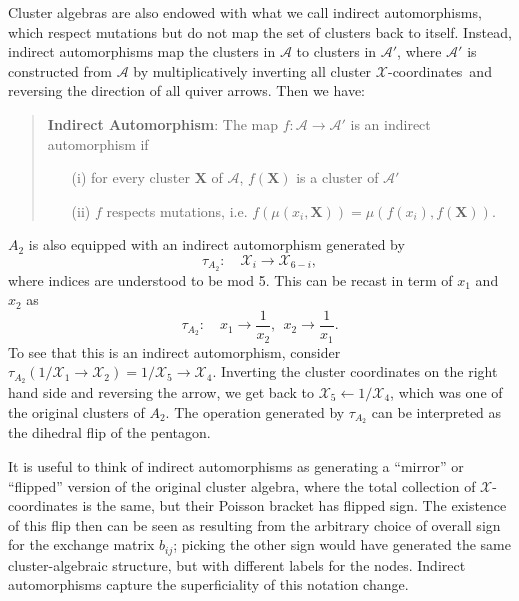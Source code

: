 \documentclass[12pt]{article}
\def\x{\mathcal{X}}
\def\xcoords{$\mathcal{X}$-coordinates}
\def\a{\mathcal{A}}
\begin{document}
Cluster algebras are also endowed with what we call indirect automorphisms, which respect mutations but do not map the set of clusters back to itself. Instead, indirect automorphisms map the clusters in $\a$ to clusters in $\a'$, where $\a'$ is constructed from $\a$ by multiplicatively inverting all cluster \xcoords\ and reversing the direction of all quiver arrows. Then we have:
\begin{quote}
{\bf Indirect Automorphism}: The map $f: \a \to \a'$ is an indirect automorphism if 
\vspace{-.2cm}
\begin{itemize}
  \item[(i)] for every cluster $\mathbf{X}$ of $\a$, $f(\mathbf{X})$ is a cluster of $\a'$ 
  \item[(ii)] $f$ respects mutations, i.e. $f(\mu(x_i,\mathbf{X})) = \mu(f(x_i),f(\mathbf{X}))$.
\end{itemize}
\end{quote}
$A_2$ is also equipped with an indirect automorphism generated by
\begin{equation}
  \tau_{A_2}:\quad \mathcal{X}_i \to \mathcal{X}_{6-i},
\end{equation}
where indices are understood to be mod 5. This can be recast in term of $x_1$ and $x_2$ as
\begin{equation}
  \tau_{A_2}:\quad x_1 \to \frac{1}{x_2}, ~~x_2 \to \frac{1}{x_1}.
\end{equation}
To see that this is an indirect automorphism, consider $\tau_{A_2}(1/\x_1 \to \x_2) = 1/\x_5 \to \x_4$. Inverting the cluster coordinates on the right hand side and reversing the arrow, we get back to $\x_5 \leftarrow 1/\x_4$, which was one of the original clusters of $A_2$. The operation generated by $\tau_{A_2}$ can be interpreted as the dihedral flip of the pentagon. 

It is useful to think of indirect automorphisms as generating a ``mirror'' or ``flipped'' version of the original cluster algebra, where the total collection of $\x$-coordinates is the same, but their Poisson bracket has flipped sign. The existence of this flip then can be seen as resulting from the arbitrary choice of overall sign for the exchange matrix $b_{ij}$; picking the other sign would have generated the same cluster-algebraic structure, but with different labels for the nodes. Indirect automorphisms capture the superficiality of this notation change.
\end{document}
